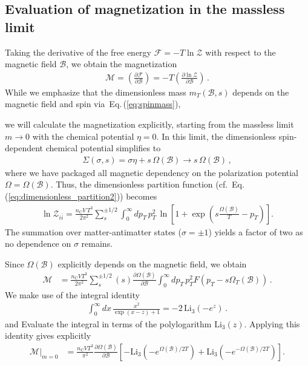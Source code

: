 \documentclass[epjST]{svjour}
\newcommand{\req}[1]{Eq.\,(\ref{#1})}
\begin{document}
\subsection{Evaluation of magnetization in the massless limit}
\label{sec:magnetization_evaluation}
Taking the derivative of the free energy \(\mathcal{F} = -T \ln\mathcal{Z}\) with respect to the magnetic field \(\mathcal{B}\), we obtain the magnetization
\begin{align}
\label{eq:magnetization_def}
\mathcal{M} = \left( \frac{\partial \mathcal{F}}{\partial \mathcal{B}} \right) = -T \left( \frac{\partial \ln\mathcal{Z}}{\partial \mathcal{B}} \right)\,.
\end{align} 
While we emphasize that the dimensionless mass \(m_{T}(\mathcal{B},s)\) depends on the magnetic field and spin via~\req{eq:spinmass}, {\color{blue}we will calculate the magnetization explicitly, starting from the massless limit \(m\to 0\) with the chemical potential \(\eta=0\). In this limit, the dimensionless spin-dependent chemical potential simplifies to
\begin{align}
\Sigma(\sigma,s) = \sigma\eta + s\,\Omega(\mathcal{B}) \rightarrow s\,\Omega(\mathcal{B})\,,
\end{align}
where we have packaged all magnetic dependency on the polarization potential \(\Omega=\Omega(\mathcal{B})\). Thus, the dimensionless partition function (cf.~\req{eq:dimensionless_partition2}) becomes
\begin{align}
\ln\mathcal{Z}_{i\bar{i}} 
= \frac{n_\mathrm{C}V\,T^{3}}{2\pi^{2}}\sum_{s}^{\pm1/2}\int_{0}^{\infty}dp_{T}\,p_{T}^{2}\,\ln\left[1+\exp\left(s\frac{\Omega(\mathcal{B})}{T}-p_{T}\right)\right].
\end{align}
The summation over matter-antimatter states (\(\sigma=\pm1\)) yields a factor of two as no dependence on \(\sigma\) remains.

Since \(\Omega(\mathcal{B})\) explicitly depends on the magnetic field, we obtain
\begin{align}
\mathcal{M} &= \frac{n_\mathrm{C}VT^{3}}{2\pi^{2}}\sum_{s}^{\pm 1/2}(s)\frac{\partial\Omega(\mathcal{B})}{\partial\mathcal{B}}\int_{0}^{\infty}dp_{T}\,p_{T}^{2}F\left(p_{T}-s\Omega_{T}(\mathcal{B})\right)\,.
\end{align}
We make use of the integral identity
\begin{align}
\int_{0}^{\infty} dx\,\frac{x^{2}}{\exp\left(x-z\right)+1} = -2\,\mathrm{Li}_3(-e^{z})\,.
\end{align}
and Evaluate the integral in terms of the polylogarithm \(\mathrm{Li}_3(z)\). Applying this identity gives explicitly
\begin{align}
\label{eq:FinalMagnetization}
\mathcal{M}\vert_{m=0} &= \frac{n_\mathrm{C}VT^{3}}{\pi^{2}}\frac{\partial\Omega(\mathcal{B})}{\partial\mathcal{B}}\left[-\mathrm{Li}_3\left(-e^{\Omega(\mathcal{B})/2T}\right)+\mathrm{Li}_3\left(-e^{-\Omega(\mathcal{B})/2T}\right)\right].
\end{align}

}
\end{document}
